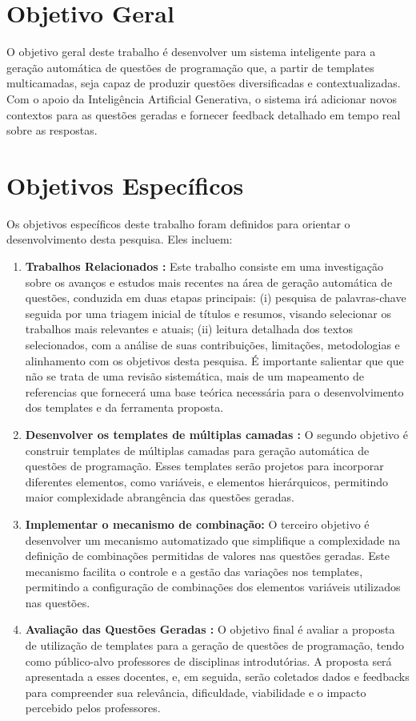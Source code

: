 \section{Objetivo Geral}

O objetivo geral deste trabalho é desenvolver um sistema inteligente para a geração automática de questões de programação que, a partir de templates multicamadas, seja capaz de produzir questões diversificadas e contextualizadas. Com o apoio da Inteligência Artificial Generativa, o sistema irá adicionar novos contextos para as questões geradas e fornecer feedback detalhado em tempo real sobre as respostas.

\section{Objetivos Específicos}

Os objetivos específicos deste trabalho foram definidos para orientar o desenvolvimento desta pesquisa. Eles incluem:

\begin{enumerate}[label=\textbf{\alph*)}]
    \item \textbf{Trabalhos Relacionados :} Este trabalho consiste em uma investigação sobre os avanços e estudos mais recentes na área de geração automática de questões, conduzida em duas etapas principais:
(i) pesquisa de palavras-chave seguida por uma triagem inicial de títulos e resumos, visando selecionar os trabalhos mais relevantes e atuais;
(ii) leitura detalhada dos textos selecionados, com a análise de suas contribuições, limitações, metodologias e alinhamento com os objetivos desta pesquisa.
É importante salientar que que não se trata de uma revisão sistemática, mais de um mapeamento de referencias que fornecerá uma base teórica necessária para o desenvolvimento dos templates e da ferramenta proposta.
    \item \textbf{Desenvolver os templates de múltiplas camadas :}  O segundo objetivo é construir templates de múltiplas camadas para geração automática de questões de programação. Esses templates serão projetos para incorporar diferentes elementos, como variáveis, e elementos hierárquicos, permitindo maior complexidade abrangência das questões geradas. 
    \item \textbf{Implementar o mecanismo de combinação:} O terceiro objetivo é desenvolver um mecanismo automatizado que simplifique a complexidade na definição de combinações permitidas de valores nas questões geradas. Este mecanismo facilita o controle e a gestão das variações nos templates, permitindo a configuração de combinações dos elementos variáveis utilizados nas questões.
    \item \textbf{Avaliação das Questões Geradas :}  
O objetivo final é avaliar a proposta de utilização de templates para a geração de questões de programação, tendo como público-alvo professores de disciplinas introdutórias. A proposta será apresentada a esses docentes, e, em seguida, serão coletados dados e feedbacks para compreender sua relevância, dificuldade, viabilidade e o impacto percebido pelos professores.

 
\end{enumerate}


